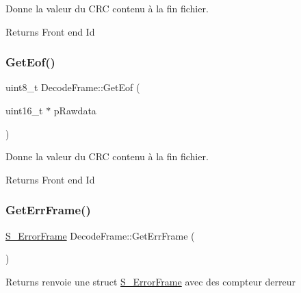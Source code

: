 Donne la valeur du C\+RC contenu à la fin fichier. 

\begin{DoxyReturn}{Returns}
Front end Id 
\end{DoxyReturn}
\mbox{\label{classDecodeFrame_a85867f5f906e63c94c8f4032c1fb973a}} 
\subsubsection{\texorpdfstring{Get\+Eof()}{GetEof()}}
{\footnotesize\ttfamily uint8\+\_\+t Decode\+Frame\+::\+Get\+Eof (\begin{DoxyParamCaption}\item[{uint16\+\_\+t $\ast$}]{p\+Rawdata }\end{DoxyParamCaption})\hspace{0.3cm}{\ttfamily [inline]}}



Donne la valeur du C\+RC contenu à la fin fichier. 

\begin{DoxyReturn}{Returns}
Front end Id 
\end{DoxyReturn}
\mbox{\label{classDecodeFrame_af2f7c0e88138db96e36d866d1845fa03}} 
\subsubsection{\texorpdfstring{Get\+Err\+Frame()}{GetErrFrame()}}
{\footnotesize\ttfamily \hyperlink{structS__ErrorFrame}{S\+\_\+\+Error\+Frame} Decode\+Frame\+::\+Get\+Err\+Frame (\begin{DoxyParamCaption}{ }\end{DoxyParamCaption})\hspace{0.3cm}{\ttfamily [inline]}}

\begin{DoxyReturn}{Returns}
renvoie une struct \hyperlink{structS__ErrorFrame}{S\+\_\+\+Error\+Frame} avec des compteur d\textquotesingle{}erreur 
\end{DoxyReturn}
\mbox{\label{classDecodeFrame_a27a2218fdc331c7c4afb1b57c103edac}} 
